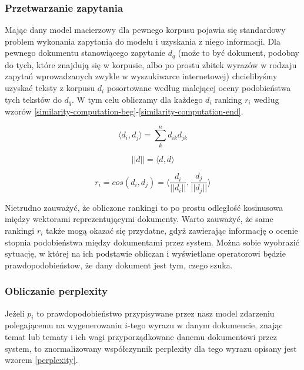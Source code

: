 \documentclass[11pt,a4paper]{article}
\begin{document}
\subsubsection{Przetwarzanie zapytania}
\label{processing}

Mając dany model macierzowy dla pewnego korpusu pojawia się standardowy problem
wykonania zapytania do modelu i uzyskania z niego informacji. Dla pewnego
dokumentu stanowiącego zapytanie $d_q$ (może to być dokument, podobny do tych,
które znajdują się w korpusie, albo po prostu zbitek wyrazów w rodzaju zapytań
wprowadzanych zwykle w wyszukiwarce internetowej) chcielibyśmy uzyskać teksty z
korpusu $d_i$ posortowane według malejącej oceny podobieństwa tych tekstów do
$d_q$. W tym celu obliczamy dla każdego $d_i$ ranking $r_i$ według wzorów
\ref{similarity-computation-beg}-\ref{similarity-computation-end}.

\begin{equation}
\label{similarity-computation-beg}
  \langle d_i, d_j \rangle = \sum_k^n d_{ik}d_{jk}
\end{equation}

\begin{equation}
  ||d|| = \langle d, d \rangle
\end{equation}

\begin{equation}
  \label{similarity-computation-end}
  r_i = cos(d_i, d_j) = \langle \frac{d_i}{||d_i||}, \frac{d_j}{||d_j||} \rangle
\end{equation}

Nietrudno zauważyć, że obliczone rankingi to po prostu odległość kosinusowa
między wektorami reprezentującymi dokumenty.  Warto zauważyć, że same rankingi
$r_i$ także mogą okazać się przydatne, gdyż zawierając informację o ocenie
stopnia podobieństwa między dokumentami przez system. Można sobie wyobrazić
sytuację, w której na ich podstawie obliczan i wyświetlane operatorowi będzie
prawdopodobieństow, że dany dokument jest tym, czego szuka.

\subsubsection{Obliczanie perplexity}

Jeżeli $p_i$ to prawdopodobieństwo przypisywane przez nasz model zdarzeniu
polegającemu na wygenerowaniu $i$-tego wyrazu w danym dokumencie, znając temat
lub tematy i ich wagi przyporządkowane danemu dokumentowi przez system, to
znormalizowany współczynnik perplexity dla tego wyrazu opisany jest wzorem
\ref{perplexity}.
\end{document}
